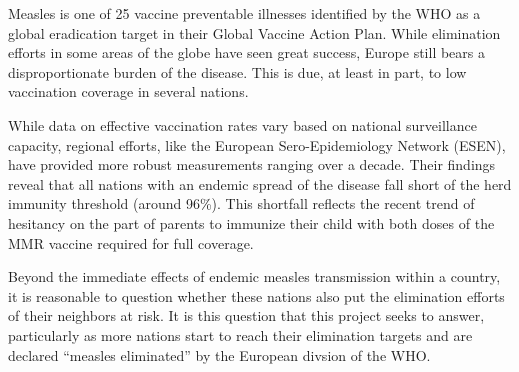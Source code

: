 \documentclass[../Paper.tex]{subfiles}
\begin{document}
\raggedright
Measles is one of 25 vaccine preventable illnesses identified by the WHO as a 
global eradication target in their Global Vaccine Action Plan. While elimination
efforts in some areas of the globe have seen great success, Europe still bears a
disproportionate burden of the disease. This is due, at least in part, to low
vaccination coverage in several nations. 

While data on effective vaccination rates vary based on national surveillance
capacity, regional efforts, like the European Sero-Epidemiology Network (ESEN),
have provided more robust measurements ranging over a decade. Their findings
reveal that all nations with an endemic spread of the disease fall short of the
herd immunity threshold (around 96\%). This shortfall reflects the recent trend 
of hesitancy on the part of parents to immunize their child with both doses of 
the MMR vaccine required for full coverage.

Beyond the immediate effects of endemic measles transmission within a country,
it is reasonable to question whether these nations also put the elimination efforts
of their neighbors at risk. It is this question that this project seeks to answer, 
particularly as more nations start to reach their elimination targets and are declared
``measles eliminated'' by the European divsion of the WHO.

\clearpage
\end{document}
